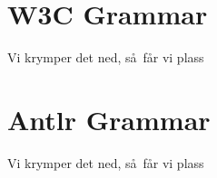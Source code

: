 \appendix
\chapter{W3C Grammar}
Vi krymper det ned, s\aa ~f\aa r vi plass
\chapter{Antlr Grammar}
Vi krymper det ned, s\aa ~f\aa r vi plass
